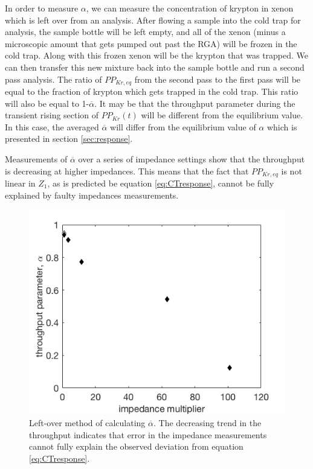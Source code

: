 \documentclass[12pt]{article}
\begin{document}
In order to measure $\alpha$, we can measure the concentration of krypton in xenon which is left over from an analysis. After flowing a sample into the cold trap for analysis, the sample bottle will be left empty, and all of the xenon (minus a microscopic amount that gets pumped out past the RGA) will be frozen in the cold trap. Along with this frozen xenon will be the krypton that was trapped. We can then transfer this new mixture back into the sample bottle and run a second pass analysis. The ratio of $PP_{Kr,eq}$  from the second pass to the first pass will be equal to the fraction of krypton which gets trapped in the cold trap. This ratio will also be equal to 1-$\overline{\alpha}$. It may be that the throughput parameter during the transient rising section of $PP_{Kr}(t)$ will be different from the equilibrium value. In this case, the averaged $\overline{\alpha}$ will differ from the equilibrium value of $\alpha$ which is presented in section \ref{sec:response}. 

Measurements of $\overline{\alpha}$ over a series of impedance settings show that the throughput is decreasing at higher impedances. This means that the fact that $PP_{Kr,eq}$ is not linear in $Z_1$, as is predicted be equation \ref{eq:CTresponse}, cannot be fully explained by faulty impedances measurements.
\begin{figure}[h!]
\centering
\includegraphics[width=\textwidth]{Figures/SLAC_alpha.png}
\caption{Left-over method of calculating $\overline{\alpha}$. The decreasing trend in the throughput indicates that error in the impedance measurements cannot fully explain the observed deviation from equation \ref{eq:CTresponse}. }
\label{fig:alpha}
\end{figure}
\end{document}
